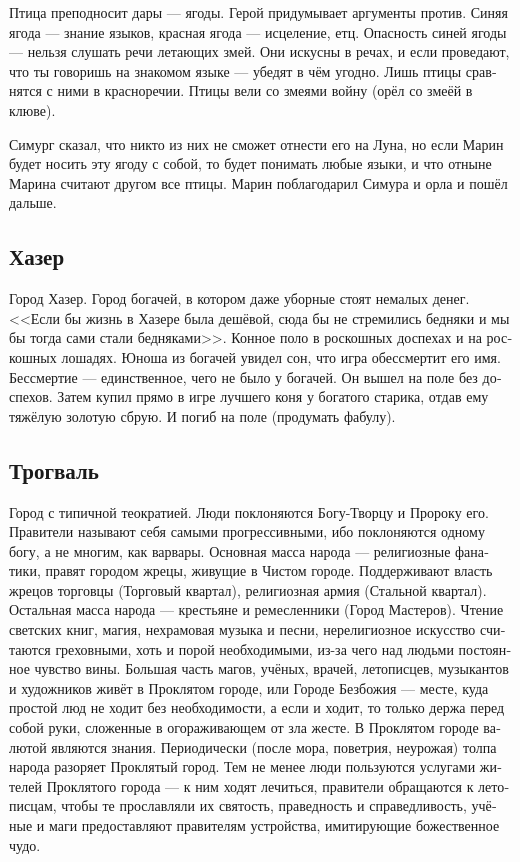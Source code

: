\documentclass[a4paper,12pt,fleqn]{book}\usepackage{cooltooltips}\usepackage{polyglossia}\setdefaultlanguage[babelshorthands=true]{russian}\setotherlanguage{english}\defaultfontfeatures{Ligatures=TeX,Mapping=tex-text} \usepackage{xcolor}\definecolor{lightgray}{HTML}{bbbbbb}\color{lightgray}\newcommand{\ml}[3]{\textenglish{\textcolor{black}{#3}}}
\begin{document}
{Птица преподносит дары --- ягоды.
Герой придумывает аргументы против.
Синяя ягода --- знание языков, красная ягода --- исцеление, етц.
Опасность синей ягоды --- нельзя слушать речи летающих змей.
Они искусны в речах, и если проведают, что ты говоришь на знакомом языке --- убедят в чём угодно.
Лишь птицы сравнятся с ними в красноречии.
Птицы вели со змеями войну (орёл со змеёй в клюве).

Симург сказал, что никто из них не сможет отнести его на Луна, но если Марин будет носить эту ягоду с собой, то будет понимать любые языки, и что отныне Марина считают другом все птицы.
Марин поблагодарил Симура и орла и пошёл дальше.

\subsection{Хазер}

Город Хазер.
Город богачей, в котором даже уборные стоят немалых денег.
<<Если бы жизнь в Хазере была дешёвой, сюда бы не стремились бедняки и мы бы тогда сами стали бедняками>>.
Конное поло в роскошных доспехах и на роскошных лошадях.
Юноша из богачей увидел сон, что игра обессмертит его имя.
Бессмертие --- единственное, чего не было у богачей.
Он вышел на поле без доспехов.
Затем купил прямо в игре лучшего коня у богатого старика, отдав ему тяжёлую золотую сбрую.
И погиб на поле (продумать фабулу).

\subsection{Трогваль}

Город с типичной теократией.
Люди поклоняются Богу-Творцу и Пророку его.
Правители называют себя самыми прогрессивными, ибо поклоняются одному богу, а не многим, как варвары.
Основная масса народа --- религиозные фанатики, правят городом жрецы, живущие в Чистом городе.
Поддерживают власть жрецов торговцы (Торговый квартал), религиозная армия (Стальной квартал).
Остальная масса народа --- крестьяне и ремесленники (Город Мастеров).
Чтение светских книг, магия, нехрамовая музыка и песни, нерелигиозное искусство считаются греховными, хоть и порой необходимыми, из-за чего над людьми постоянное чувство вины.
Большая часть магов, учёных, врачей, летописцев, музыкантов и художников живёт в Проклятом городе, или Городе Безбожия --- месте, куда простой люд не ходит без необходимости, а если и ходит, то только держа перед собой руки, сложенные в огораживающем от зла жесте.
В Проклятом городе валютой являются знания.
Периодически (после мора, поветрия, неурожая) толпа народа разоряет Проклятый город.
Тем не менее люди пользуются услугами жителей Проклятого города --- к ним ходят лечиться, правители обращаются к летописцам, чтобы те прославляли их святость, праведность и справедливость, учёные и маги предоставляют правителям устройства, имитирующие божественное чудо.

}
\end{document}
